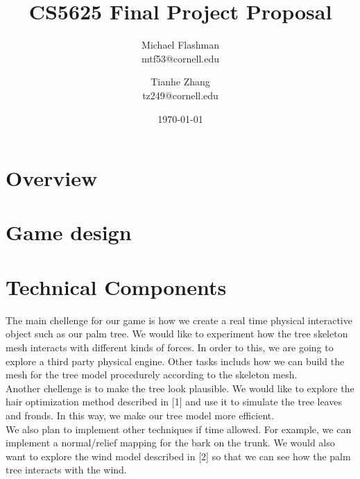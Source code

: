 \documentclass[11pt]{article}
\begin{document}
\title{CS5625 Final Project Proposal}
\author{Michael Flashman \\ mtf53@cornell.edu \and Tianhe Zhang \\ tz249@cornell.edu\\}
\date{\today}
\maketitle


\section{Overview}

\section{Game design}

\section{Technical Components}
The main chellenge for our game is how we create a real time physical interactive object such as our palm tree. We would like to experiment how the tree skeleton mesh interacts with different kinds of forces. In order to this, we are going to explore a third party physical engine. Other tasks includs how we can build the mesh for the tree model procedurely according to the skeleton mesh.\\

Another chellenge is to make the tree look plausible. We would like to explore the hair optimization method described in [1] and use it to simulate the tree leaves and fronds. In this way, we make our tree model more efficient.\\

We also plan to implement other techniques if time allowed. For example, we can implement a normal/relief mapping for the bark on the trunk. We would also want to explore the wind model described in [2] so that we can see how the palm tree interacts with the wind.

\end{document}
